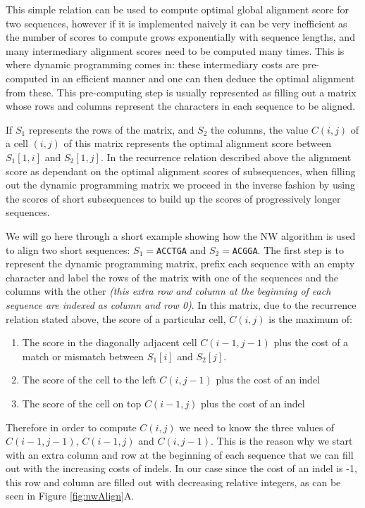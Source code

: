 \documentclass[
  11pt,
  twoside]{scrbook}
\providecommand{\tightlist}{%
  \setlength{\itemsep}{0pt}\setlength{\parskip}{0pt}}
\begin{document}
This simple relation can be used to compute optimal global alignment score for two sequences, however if it is implemented naively it can be very inefficient as the number of scores to compute grows exponentially with sequence lengths, and many intermediary alignment scores need to be computed many times. This is where dynamic programming comes in: these intermediary costs are pre-computed in an efficient manner and one can then deduce the optimal alignment from these. This pre-computing step is usually represented as filling out a matrix whose rows and columns represent the characters in each sequence to be aligned.

If \(S_1\) represents the rows of the matrix, and \(S_2\) the columns, the value \(C(i,j)\) of a cell \((i,j)\) of this matrix represents the optimal alignment score between \(S_1[1,i]\) and \(S_2[1,j]\). In the recurrence relation described above the alignment score as dependant on the optimal alignment scores of subsequences, when filling out the dynamic programming matrix we proceed in the inverse fashion by using the scores of short subsequences to build up the scores of progressively longer sequences.

We will go here through a short example showing how the NW algorithm is used to align two short sequences: \(S_1=\)\texttt{ACCTGA} and \(S_2=\)\texttt{ACGGA}. The first step is to represent the dynamic programming matrix, prefix each sequence with an empty character and label the rows of the matrix with one of the sequences and the columns with the other \emph{(this extra row and column at the beginning of each sequence are indexed as column and row 0)}. In this matrix, due to the recurrence relation stated above, the score of a particular cell, \(C(i,j)\) is the maximum of:

\begin{enumerate}
\def\labelenumi{\arabic{enumi}.}
\tightlist
\item
  The score in the diagonally adjacent cell \(C(i-1,j-1)\) plus the cost of a match or mismatch between \(S_1[i]\) and \(S_2[j]\).
\item
  The score of the cell to the left \(C(i,j-1)\) plus the cost of an indel
\item
  The score of the cell on top \(C(i-1,j)\) plus the cost of an indel
\end{enumerate}

Therefore in order to compute \(C(i,j)\) we need to know the three values of \(C(i-1,j-1)\), \(C(i-1,j)\) and \(C(i,j-1)\). This is the reason why we start with an extra column and row at the beginning of each sequence that we can fill out with the increasing costs of indels. In our case since the cost of an indel is -1, this row and column are filled out with decreasing relative integers, as can be seen in Figure \ref{fig:nwAlign}A.
\end{document}
